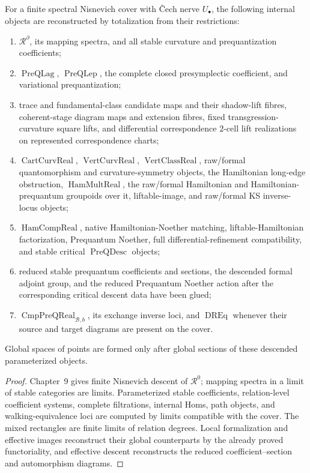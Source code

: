 \begin{theorem}
\label{thm:prequantum-finite-nisnevich-descent}
For a finite spectral Nisnevich cover with \v{C}ech nerve $U_\bullet$, the
following internal objects are reconstructed by totalization from their
restrictions:
\begin{enumerate}
\item $\mathcal R^\partial$, its mapping spectra, and all stable curvature and
      prequantization coefficients;
\item $\operatorname{PreQLag}$, $\operatorname{PreQLep}$, the complete closed
      presymplectic coefficient, and variational prequantization;
\item trace and fundamental-class candidate maps and their shadow-lift fibres,
      coherent-stage diagram maps and extension fibres, fixed
      transgression-curvature square lifts, and differential correspondence
      $2$-cell lift realizations on represented correspondence charts;
\item $\operatorname{CartCurvReal}$, $\operatorname{VertCurvReal}$,
      $\operatorname{VertClassReal}$, raw/formal
      quantomorphism and curvature-symmetry objects, the Hamiltonian long-edge
      obstruction, $\operatorname{HamMultReal}$, the raw/formal Hamiltonian and
      Hamiltonian-prequantum groupoids over it, liftable-image, and raw/formal
      KS inverse-locus objects;
\item $\operatorname{HamCompReal}$, native Hamiltonian-Noether matching,
      liftable-Hamiltonian factorization, Prequantum Noether, full
      differential-refinement compatibility, and stable critical
      $\operatorname{PreQDesc}$ objects;
\item reduced stable prequantum coefficients and sections, the descended formal
      adjoint group, and the reduced Prequantum Noether action after the
      corresponding critical descent data have been glued;
\item $\operatorname{CmpPreQReal}_{\mathcal B,b}$, its exchange inverse loci,
      and $\operatorname{DREq}$ whenever their source and target diagrams are
      present on the cover.
\end{enumerate}
Global spaces of points are formed only after global sections of these descended
parameterized objects.
\end{theorem}

\begin{proof}
Chapter~9 gives finite Nisnevich descent of $\mathcal R^0$; mapping spectra in a
limit of stable categories are limits.  Parameterized stable coefficients,
relation-level coefficient systems, complete filtrations, internal Homs, path
objects, and walking-equivalence loci are computed by limits compatible with the
cover.  The mixed rectangles are finite limits of relation degrees.  Local
formalization and effective images reconstruct their global counterparts by the
already proved functoriality, and effective descent reconstructs the reduced
coefficient--section and automorphism diagrams.
\end{proof}

